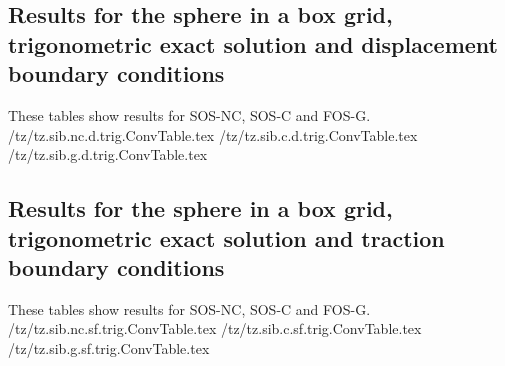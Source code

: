 \clearpage
\subsection{Results for the sphere in a box grid, trigonometric exact solution and displacement boundary conditions}
These tables show results for SOS-NC, SOS-C and FOS-G.
 \smTzDir/tz/tz.sib.nc.d.trig.ConvTable.tex
 \smTzDir/tz/tz.sib.c.d.trig.ConvTable.tex
 \smTzDir/tz/tz.sib.g.d.trig.ConvTable.tex

\clearpage
\subsection{Results for the sphere in a box grid, trigonometric exact solution and traction boundary conditions}
These tables show results for SOS-NC, SOS-C and FOS-G.
 \smTzDir/tz/tz.sib.nc.sf.trig.ConvTable.tex
 \smTzDir/tz/tz.sib.c.sf.trig.ConvTable.tex
 \smTzDir/tz/tz.sib.g.sf.trig.ConvTable.tex


